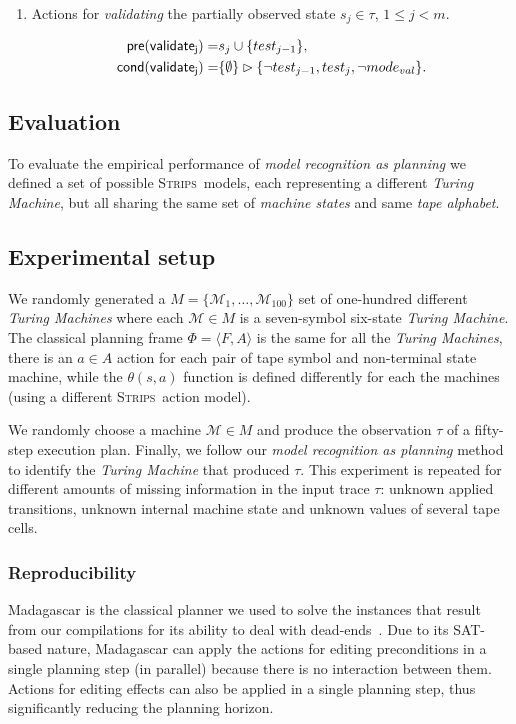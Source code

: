 \documentclass[letterpaper]{article} %
\newcommand{\tup}[1]{{\langle #1 \rangle}}
\newcommand{\pre}{\mathsf{pre}}     %
\newcommand{\cond}{\mathsf{cond}}   %
\newcommand{\strips}{\textsc{Strips}}     %
\begin{document}
\begin{itemize}
\begin{enumerate}
\item Actions for {\em validating} the partially observed state $s_j\in\tau$, {\tt\small $1\leq j< m$}.
\begin{small}
\begin{align*}
\hspace*{7pt}\pre(\mathsf{validate_{j}})=&s_j\cup\{test_{j-1}\},\\
\cond(\mathsf{validate_{j}})=&\{\emptyset\}\rhd\{\neg test_{j-1}, test_j,\neg mode_{val}\}.
\end{align*}
\end{small}
\end{enumerate}
\end{itemize}


\subsection{Evaluation}
\label{sec:evaluation}
To evaluate the empirical performance of {\em model recognition as planning} we defined a set of possible \strips\ models, each representing a different {\em Turing Machine}, but all sharing the same set of {\em machine states} and same {\em tape alphabet}. 


\subsection{Experimental setup}
We randomly generated a $M=\{\mathcal{M}_1,\ldots,\mathcal{M}_{100}\}$ set of one-hundred different {\em Turing Machines} where each $\mathcal{M}\in M$ is a seven-symbol six-state {\em Turing Machine}. The classical planning frame $\Phi=\tup{F,A}$ is the same for all the {\em Turing Machines}, there is an $a\in A$ action for each pair of tape symbol and non-terminal state machine, while the $\theta(s,a)$ function is defined differently for each the machines (using a different \strips\ action model).

We randomly choose a machine $\mathcal{M}\in M$ and produce the observation $\tau$ of a fifty-step execution plan. Finally, we follow our {\em model recognition as planning} method to identify the {\em Turing Machine} that produced $\tau$. This experiment is repeated for different amounts of missing information in the input trace $\tau$: unknown applied transitions, unknown internal machine state and unknown values of several tape cells.

\subsubsection{Reproducibility}
{\sc Madagascar} is the classical planner we used to solve the instances that result from our compilations for its ability to deal with dead-ends~\cite{rintanen2014madagascar}. Due to its SAT-based nature, {\sc Madagascar} can apply the actions for editing preconditions in a single planning step (in parallel) because there is no interaction between them. Actions for editing effects can also be applied in a single planning step, thus significantly reducing the planning horizon.
\end{document}
